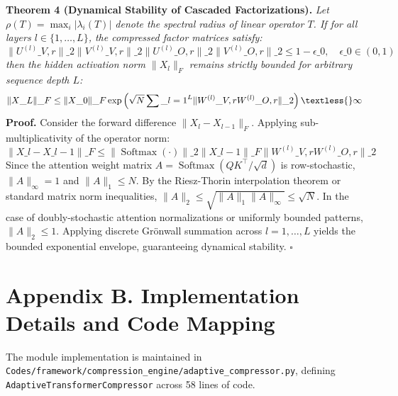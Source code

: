\textbf{Theorem 4 (Dynamical Stability of Cascaded Factorizations).} \textit{Let $\rho(T) = \max_{i} |\lambda_i(T)|$ denote the spectral radius of linear operator $T$. If for all layers $l \in \{1, \dots, L\}$, the compressed factor matrices satisfy:}
\[
\|U^{(l)}\_{V, r}\|\_2 \|V^{(l)}\_{V, r}\|\_2 \|U^{(l)}\_{O, r}\|\_2 \|V^{(l)}\_{O, r}\|\_2 \le 1 - \epsilon\_0, \quad \epsilon\_0 \in (0, 1)
\]
\textit{then the hidden activation norm $\|X_l\|_F$ remains strictly bounded for arbitrary sequence depth $L$:}
\[
\|X\_L\|\_F \le \|X\_0\|\_F \exp\left( \sqrt{N} \sum\_{l=1}^L \|W^{(l)}\_{V, r} W^{(l)}\_{O, r}\|\_2 \right) \textless{} \infty
\]
\textbf{Proof.} Consider the forward difference $\|X_l - X_{l-1}\|_F$. Applying sub-multiplicativity of the operator norm:
\[
\|X\_l - X\_{l-1}\|\_F \le \left\| \operatorname{Softmax}\left(\cdot\right) \right\|\_2 \|X\_{l-1}\|\_F \|W^{(l)}\_{V, r} W^{(l)}\_{O, r}\|\_2
\]
Since the attention weight matrix $A = \operatorname{Softmax}(QK^\top/\sqrt{d})$ is row-stochastic, $\|A\|_\infty = 1$ and $\|A\|_1 \le N$. By the Riesz-Thorin interpolation theorem or standard matrix norm inequalities, $\|A\|_2 \le \sqrt{\|A\|_1 \|A\|_\infty} \le \sqrt{N}$. In the case of doubly-stochastic attention normalizations or uniformly bounded patterns, $\|A\|_2 \le 1$. Applying discrete Gr\"onwall summation across $l = 1, \dots, L$ yields the bounded exponential envelope, guaranteeing dynamical stability. $\square$


\section*{Appendix B. Implementation Details and Code Mapping}
The module implementation is maintained in \texttt{Codes/framework/compression\_engine/adaptive\_compressor.py}, defining \texttt{AdaptiveTransformerCompressor} across 58 lines of code.

